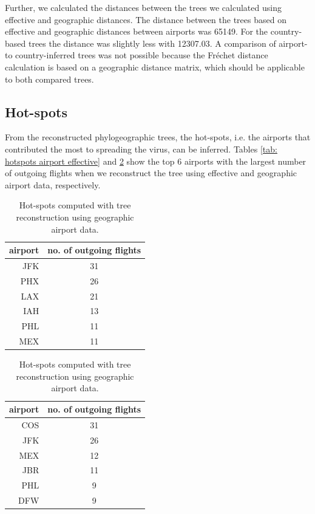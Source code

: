 \documentclass{article}
\begin{document}
Further, we calculated the distances between the trees we calculated using effective and geographic distances. The distance between the trees based on effective and geographic distances between airports was 65149. For the country-based trees the distance was slightly less with 12307.03. A comparison of airport- to country-inferred trees was not possible because the Fr\'{e}chet distance calculation is based on a geographic distance matrix, which should be applicable to both compared trees.

\subsection{Hot-spots}
From the reconstructed phylogeographic trees, the hot-spots, i.e. the airports that contributed the most to spreading the virus, can be inferred. Tables \ref{tab: hotspots airport effective} and \ref{tab: hotspots airport geographic} show the top 6 airports with the largest number of outgoing flights when we reconstruct the tree using effective and geographic airport data, respectively.

\begin{table}[h!]
\centering
\parbox{.45\linewidth}{
\centering
\begin{tabular}{r|c}
airport & no. of outgoing flights \\
\hline
JFK      & 31                      \\
PHX      & 26                      \\
LAX      & 21                      \\
IAH      & 13                      \\
PHL      & 11                      \\
MEX      & 11                                     
\end{tabular}
\caption{Hot-spots computed with tree reconstruction using effective airport data.}
\label{tab: hotspots airport effective}
}
\qquad
\parbox{.45\linewidth}{
\centering
\begin{tabular}{r|c}
airport & no. of outgoing flights \\
\hline
COS      & 31                      \\
JFK      & 26                      \\
MEX      & 12                      \\
JBR      & 11                      \\
PHL      & 9                       \\
DFW      & 9                                
\end{tabular}
\caption{Hot-spots computed with tree reconstruction using geographic airport data.}
\label{tab: hotspots airport geographic}
}
\end{table}
\end{document}
